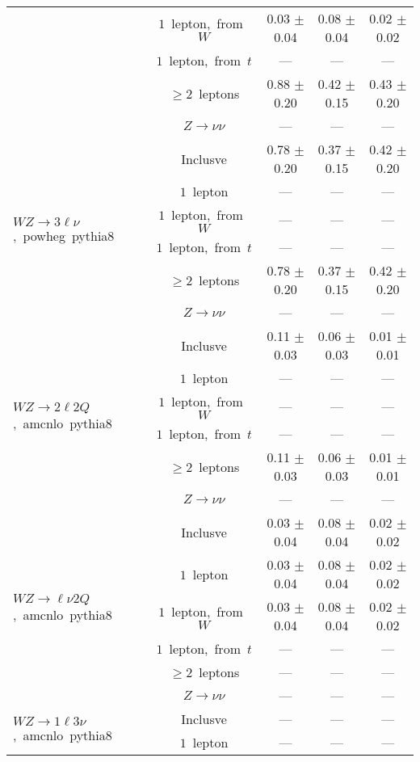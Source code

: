 \documentclass{article}
\begin{document}
\begin{longtable}{|l|c|c|c|c|}
 & $1$~lepton,~from~$W$  & 0.03 $\pm$ 0.04  & 0.08 $\pm$ 0.04  & 0.02 $\pm$ 0.02 \\* 
 & $1$~lepton,~from~$t$  & ---  & ---  & --- \\* 
 & $\ge2$~leptons  & 0.88 $\pm$ 0.20  & 0.42 $\pm$ 0.15  & 0.43 $\pm$ 0.20 \\* 
 & $Z\rightarrow\nu\nu$  & ---  & ---  & --- \\* 
\hline 
\multirow{6}{*}{$WZ{\rightarrow}3\ell\nu$,~powheg~pythia8} & Inclusve  & 0.78 $\pm$ 0.20  & 0.37 $\pm$ 0.15  & 0.42 $\pm$ 0.20 \\* 
 & $1$~lepton  & ---  & ---  & --- \\* 
 & $1$~lepton,~from~$W$  & ---  & ---  & --- \\* 
 & $1$~lepton,~from~$t$  & ---  & ---  & --- \\* 
 & $\ge2$~leptons  & 0.78 $\pm$ 0.20  & 0.37 $\pm$ 0.15  & 0.42 $\pm$ 0.20 \\* 
 & $Z\rightarrow\nu\nu$  & ---  & ---  & --- \\* 
\hline 
\multirow{6}{*}{$WZ{\rightarrow}2{\ell}2Q$,~amcnlo~pythia8} & Inclusve  & 0.11 $\pm$ 0.03  & 0.06 $\pm$ 0.03  & 0.01 $\pm$ 0.01 \\* 
 & $1$~lepton  & ---  & ---  & --- \\* 
 & $1$~lepton,~from~$W$  & ---  & ---  & --- \\* 
 & $1$~lepton,~from~$t$  & ---  & ---  & --- \\* 
 & $\ge2$~leptons  & 0.11 $\pm$ 0.03  & 0.06 $\pm$ 0.03  & 0.01 $\pm$ 0.01 \\* 
 & $Z\rightarrow\nu\nu$  & ---  & ---  & --- \\* 
\hline 
\multirow{6}{*}{$WZ{\rightarrow}{\ell}{\nu}2Q$,~amcnlo~pythia8} & Inclusve  & 0.03 $\pm$ 0.04  & 0.08 $\pm$ 0.04  & 0.02 $\pm$ 0.02 \\* 
 & $1$~lepton  & 0.03 $\pm$ 0.04  & 0.08 $\pm$ 0.04  & 0.02 $\pm$ 0.02 \\* 
 & $1$~lepton,~from~$W$  & 0.03 $\pm$ 0.04  & 0.08 $\pm$ 0.04  & 0.02 $\pm$ 0.02 \\* 
 & $1$~lepton,~from~$t$  & ---  & ---  & --- \\* 
 & $\ge2$~leptons  & ---  & ---  & --- \\* 
 & $Z\rightarrow\nu\nu$  & ---  & ---  & --- \\* 
\hline 
\multirow{6}{*}{$WZ{\rightarrow}1{\ell}3{\nu}$,~amcnlo~pythia8} & Inclusve  & ---  & ---  & --- \\* 
 & $1$~lepton  & ---  & ---  & --- \\* 

\end{longtable}
\end{document}
